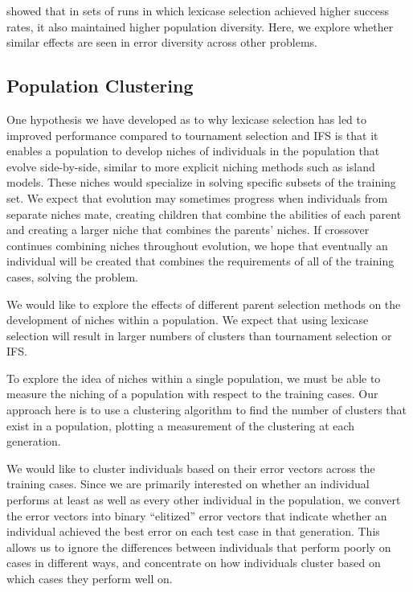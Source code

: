 \cite{Helmuth:2015:ieeeTEC} showed that in sets of runs in which lexicase selection achieved higher success rates, 
it also maintained higher population diversity. Here, we  explore whether similar 
effects are seen in error diversity across other problems.

\subsection{Population Clustering}
\label{sec:clusterCountDef}

One hypothesis we have developed as to why lexicase selection has led to improved performance compared to tournament selection and IFS is that it enables a population to develop niches of individuals in the population that evolve side-by-side, similar to more explicit niching methods such as island models. These niches would specialize in solving specific subsets of the training set. We expect that evolution may sometimes progress when individuals from separate niches mate, creating children that combine the abilities of each parent and creating a larger niche that combines the parents' niches. If crossover continues combining niches throughout evolution, we hope that eventually an individual will be created that combines the requirements of all of the training cases, solving the problem.

We would like to explore the effects of different parent selection methods on the development of niches within a population. We expect that using lexicase selection will result in larger numbers of clusters than tournament selection or IFS.

To explore the idea of niches within a single population, we must be able to measure the niching of a 
population with respect to the training cases. Our approach here is to use a clustering algorithm to find 
the number of clusters that exist in a population, plotting a measurement of the clustering at each 
generation.

We would like to cluster individuals based on their error vectors across the training cases. 
Since we are primarily interested on whether an individual performs at least as well as every other 
individual in the population, we convert the error vectors into binary ``elitized'' error vectors 
that indicate whether an individual achieved the best error on each test case in that generation. 
This allows us to ignore the differences between individuals that perform poorly on cases in different 
ways, and concentrate on how individuals cluster based on which cases they perform well on.

